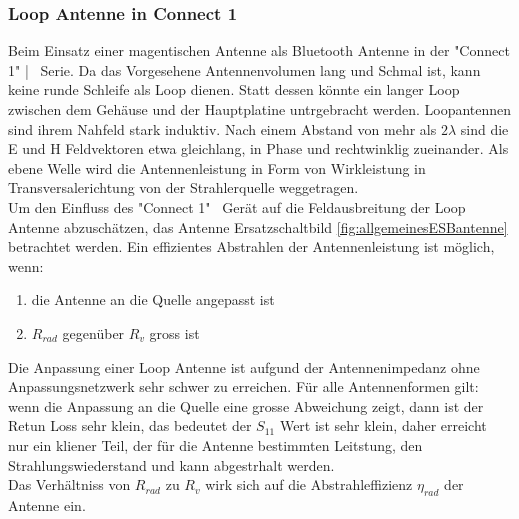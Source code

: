 \subsubsection{Loop Antenne in Connect 1}
Beim Einsatz einer magentischen Antenne als Bluetooth Antenne in der "Connect 1" | \ Serie. Da das Vorgesehene Antennenvolumen lang und Schmal ist, kann keine runde Schleife als Loop dienen. Statt dessen  könnte ein langer Loop zwischen dem Gehäuse und der Hauptplatine untrgebracht werden. Loopantennen sind ihrem Nahfeld stark induktiv. Nach einem Abstand von mehr als $2\lambda$ sind die E und H Feldvektoren etwa gleichlang, in Phase und rechtwinklig zueinander. Als ebene Welle wird die Antennenleistung in Form von Wirkleistung in Transversalerichtung von der Strahlerquelle weggetragen.\\
Um den Einfluss des "Connect 1" \ Gerät auf die Feldausbreitung der Loop Antenne abzuschätzen, das Antenne Ersatzschaltbild \ref{fig:allgemeinesESBantenne}  betrachtet werden. Ein effizientes Abstrahlen der Antennenleistung ist möglich, wenn:
  \begin{enumerate}[label={\alph*)}] 
     \item die Antenne an die Quelle angepasst ist 
     \item $R_{rad}$ gegenüber $R_{v}$ gross ist 
  \end{enumerate} 
  
Die Anpassung einer Loop Antenne ist aufgund der Antennenimpedanz ohne Anpassungsnetzwerk sehr schwer zu erreichen. Für alle Antennenformen gilt: wenn die Anpassung an die Quelle eine grosse Abweichung zeigt, dann ist der Retun Loss sehr klein, das bedeutet der $S_{11}$ Wert ist sehr klein, daher erreicht nur ein kliener Teil, der für die Antenne bestimmten Leitstung, den Strahlungswiederstand und kann abgestrhalt werden.\\
Das Verhältniss von $R_{rad}$ zu $R_{v}$ wirk sich auf die Abstrahleffizienz $\eta_{rad}$ der Antenne ein. 


